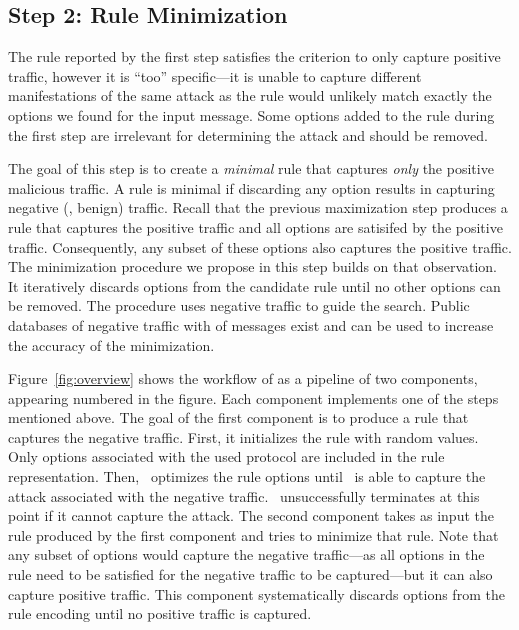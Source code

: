 \documentclass[runningheads]{llncs}
\begin{document}
\subsection{Step 2: Rule Minimization}

The rule reported by the first step satisfies the criterion to only
capture positive traffic, however it is ``too'' specific---it is
unable to capture different manifestations of the same attack as the
rule would unlikely match exactly the options we found for the input
message. Some options added to the rule during the first step are
irrelevant for determining the attack and should be removed.

The goal of this step is to create a \emph{minimal} rule that captures
\emph{only} the positive malicious traffic. A rule is minimal if
discarding any option results in capturing negative (\ie{}, benign)
traffic. Recall that the previous maximization step produces a rule
that captures the positive traffic and all options are satisifed by
the positive traffic. Consequently, any subset of these options also
captures the positive traffic. The minimization procedure we propose
in this step builds on that observation. It iteratively discards
options from the candidate rule until no other options can be
removed. The procedure uses negative traffic to guide the
search. Public databases of negative traffic with  of
messages exist  and can be used to increase the
accuracy of the minimization.




Figure~\ref{fig:overview} shows the workflow of \tname{} as a pipeline
of two components, appearing numbered in the figure. Each component
implements one of the steps mentioned above. The goal of the first
component is to produce a rule that captures the negative traffic.
First, it initializes the rule with random values. Only options
associated with the used protocol are included in the rule
representation. Then, \tname\ optimizes the rule options until
\suri\ is able to capture the attack associated with the negative
traffic.  \tname\ unsuccessfully terminates at this point if it cannot
capture the attack. The second component takes as input the rule
produced by the first component and tries to minimize that rule. Note
that any subset of options would capture the negative traffic---as all
options in the rule need to be satisfied for the negative traffic to
be captured---but it can also capture positive traffic. This component
systematically discards options from the rule encoding until no
positive traffic is captured.
\end{document}
